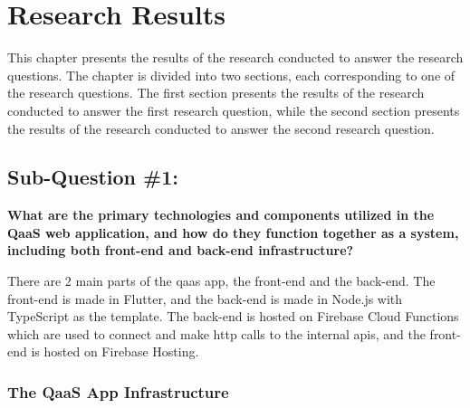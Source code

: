 \chapter{Research Results}
This chapter presents the results of the research conducted to answer the research questions. The chapter is
divided into two sections, each corresponding to one of the research questions. The first section presents
the results of the research conducted to answer the first research question, while the second section
presents the results of the research conducted to answer the second research question.

\section{Sub-Question \#1:}

\textbf{What are the primary technologies and components utilized in the QaaS web application, and
      how do they function together as a system, including both front-end and back-end infrastructure?}

There are 2 main parts of the \acrshort{qaas} app, the front-end and the back-end. The front-end is made in
Flutter, and the back-end is made in Node.js with TypeScript as the template. The back-end is hosted on Firebase Cloud Functions which are
used to connect and make \acrshort{http} calls to the internal \acrshort{api}s, and the front-end is hosted on Firebase Hosting.

\subsection{The QaaS App Infrastructure}

